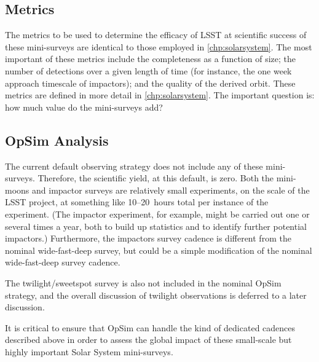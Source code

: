 \subsection{Metrics}
\label{sec:\secname:metrics}

The metrics to be used to determine the efficacy of LSST
at scientific success of these mini-surveys are identical
to those employed in \autoref{chp:solarsystem}.
The most important of these metrics
include the completeness as a function of size; the
number of detections over a given length of time (for instance,
the one week approach timescale of impactors); and
the quality of the derived orbit. These metrics are defined
in more detail in \autoref{chp:solarsystem}. The important question is:
how much value do the mini-surveys add?



\subsection{OpSim Analysis}
\label{sec:\secname:analysis}

The current default observing strategy does not include
any of these mini-surveys. Therefore, the scientific yield,
at this default, is zero. Both the mini-moons and impactor
surveys are relatively small experiments, on the scale of
the LSST project, at something like 10--20~hours total
per instance of the experiment. (The impactor experiment,
for example, might be carried out one or several times a year,
both to build up statistics and to identify further potential
impactors.) Furthermore, the impactors survey cadence
is different from the nominal wide-fast-deep survey,
but could be a simple modification of the nominal wide-fast-deep survey
cadence.

The twilight/sweetspot survey is also not included in
the nominal OpSim strategy, and the overall discussion
of twilight observations is deferred to a later discussion.

It is critical to ensure that OpSim can handle the kind
of dedicated cadences described above in order to assess
the global impact of these small-scale but highly
important Solar System mini-surveys.



%
%
%
%

